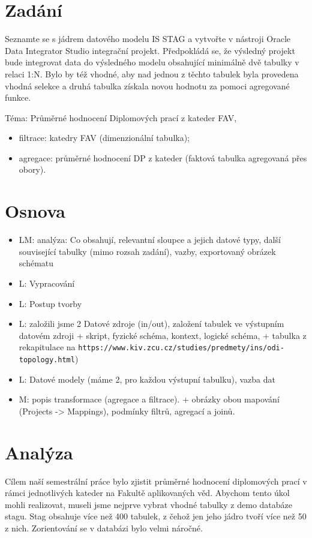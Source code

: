 \section{Zadání}

Seznamte se s jádrem datového modelu IS STAG a vytvořte v nástroji Oracle Data Integrator Studio integrační projekt.
Předpokládá se, že výsledný projekt bude integrovat data do výsledného modelu obsahující minimálně dvě tabulky v relaci 1:N.
Bylo by též vhodné, aby nad jednou z těchto tabulek byla provedena vhodná selekce a druhá tabulka získala novou hodnotu za pomoci agregované funkce.

Téma: Průměrné hodnocení Diplomových prací z kateder FAV,

\begin{itemize}
    \item filtrace: katedry FAV (dimenzionální tabulka);
    \item agregace: průměrné hodnocení DP z kateder (faktová tabulka agregovaná přes obory).
\end{itemize}

\section{Osnova}

\begin{itemize}
    \item LM: analýza: Co obsahují, relevantní sloupce a jejich datové typy, další související tabulky (mimo rozsah zadání), vazby, exportovaný obrázek schématu
    \item L: Vypracování
    \item L: Postup tvorby
    \item L: založili jsme 2 Datové zdroje (in/out), založení tabulek ve výstupním datovém zdroji + skript, fyzické schéma, kontext, logické schéma, + tabulka z rekapitulace na \nolinkurl{https://www.kiv.zcu.cz/studies/predmety/ins/odi-topology.html})
    \item L: Datové modely (máme 2, pro každou výstupní tabulku), vazba dat
    \item M: popis transformace (agregace a filtrace). + obrázky obou mapování (Projects -> Mappings), podmínky filtrů, agregací a joinů.
\end{itemize}




\section{Analýza}
Cílem naší semestrální práce bylo zjistit průměrné hodnocení diplomových prací v rámci jednotlivých kateder na Fakultě aplikovaných věd. Abychom tento úkol mohli realizovat, museli jsme nejprve vybrat vhodné tabulky z demo databáze stagu. Stag obsahuje více než 400 tabulek, z čehož jen jeho jádro tvoří více než 50 z nich. Zorientování se v databázi bylo velmi náročné. 

